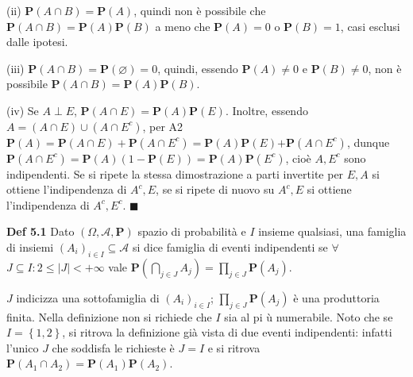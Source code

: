 \documentclass{article}
\begin{document}
(ii) $\mathbf{P}\left( A\cap B\right) =\mathbf{P}\left( A\right) $, quindi
non \`{e} possibile che $\mathbf{P}\left( A\cap B\right) =\mathbf{P}\left(
A\right) \mathbf{P}\left( B\right) $ a meno che $\mathbf{P}\left( A\right)
=0 $ o $\mathbf{P}\left( B\right) =1$, casi esclusi dalle ipotesi.

(iii) $\mathbf{P}\left( A\cap B\right) =\mathbf{P}\left( \varnothing \right)
=0$, quindi, essendo $\mathbf{P}\left( A\right) \neq 0$ e $\mathbf{P}\left(
B\right) \neq 0$, non \`{e} possibile $\mathbf{P}\left( A\cap B\right) =%
\mathbf{P}\left( A\right) \mathbf{P}\left( B\right) $.

(iv) Se $A\perp E$, $\mathbf{P}\left( A\cap E\right) =\mathbf{P}\left(
A\right) \mathbf{P}\left( E\right) $. Inoltre, essendo $A=\left( A\cap
E\right) \cup \left( A\cap E^{c}\right) $, per A2 $\mathbf{P}\left( A\right)
=\mathbf{P}\left( A\cap E\right) +\mathbf{P}\left( A\cap E^{c}\right) =%
\mathbf{P}\left( A\right) \mathbf{P}\left( E\right) \mathbf{+P}\left( A\cap
E^{c}\right) $, dunque $\mathbf{P}\left( A\cap E^{c}\right) \mathbf{=P}%
\left( A\right) \left( 1-\mathbf{P}\left( E\right) \right) =\mathbf{P}\left(
A\right) \mathbf{P}\left( E^{c}\right) $, cio\`{e} $A,E^{c}$ sono
indipendenti. Se si ripete la stessa dimostrazione a parti invertite per $%
E,A $ si ottiene l'indipendenza di $A^{c},E$, se si ripete di nuovo su $%
A^{c},E$ si ottiene l'indipendenza di $A^{c},E^{c}$. $\blacksquare $

\textbf{Def 5.1} Dato $\left( \Omega ,\mathcal{A},\mathbf{P}\right) $ spazio
di probabilit\`{a} e $I$ insieme qualsiasi, una famiglia di insiemi $\left(
A_{i}\right) _{i\in I}\subseteq \mathcal{A}$ si dice famiglia di eventi
indipendenti se $\forall $ $J\subseteq I:2\leq \left\vert J\right\vert
<+\infty $ vale $\mathbf{P}\left( \bigcap_{j\in J}A_{j}\right) =\prod_{j\in
J}\mathbf{P}\left( A_{j}\right) $.

$J$ indicizza una sottofamiglia di $\left(
A_{i}\right) _{i\in I}$; $\prod_{j\in J}\mathbf{P}\left( A_{j}\right) $ \`{e}
una produttoria finita. Nella definizione non si richiede che $I$ sia al pi%
\`{u} numerabile. Noto che se $I=\left\{ 1,2\right\} $, si ritrova la
definizione gi\`{a} vista di due eventi indipendenti: infatti l'unico $J$
che soddisfa le richieste \`{e} $J=I$ e si ritrova $\mathbf{P}\left(
A_{1}\cap A_{2}\right) =\mathbf{P}\left( A_{1}\right) \mathbf{P}\left(
A_{2}\right) $.
\end{document}
